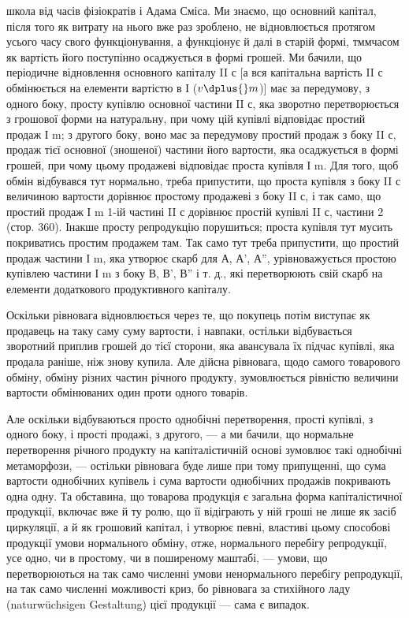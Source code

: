 \parcont{}  %
школа від часів фізіократів і Адама Сміса. Ми знаємо, що основний
капітал, після того як витрату на нього вже раз зроблено, не відновлюється
протягом усього часу свого функціонування, а функціонує й
далі в старій формі, тммчасом як вартість його поступінно осаджується
в формі грошей. Ми бачили, що періодичне відновлення основного капіталу
II с [а вся капітальна вартість II с обмінюється на елементи вартістю
в І ($v \dplus{} m$)] має за передумову, з одного боку, просту купівлю
основної частини II с, яка зворотно перетворюється з грошової форми
на натуральну, при чому цій купівлі відповідає простий продаж І m;
з другого боку, воно має за передумову простий продаж з боку
II с, продаж тієї основної (зношеної) частини його вартости, яка осаджується
в формі грошей, при чому цьому продажеві відповідає проста
купівля І m. Для того, щоб обмін відбувався тут нормально, треба припустити,
що проста купівля з боку II с величиною вартости дорівнює
простому продажеві з боку II с, і так само, що простий продаж І m
1-ій частині II с дорівнює простій купівлі II с, частини 2 (стор. 360).
Інакше просту репродукцію порушиться; проста купівля тут мусить
покриватись простим продажем там. Так само тут треба припустити,
що простий продаж частини І m, яка утворює скарб для А,
А', А'', урівноважується простою купівлею частини І m з боку В, В', В''
і т. д., які перетворюють свій скарб на елементи додаткового продуктивного
капіталу.

Оскільки рівновага відновлюється через те, що покупець потім виступає
як продавець на таку саму суму вартости, і навпаки, остільки відбувається
зворотний приплив грошей до тієї сторони, яка авансувала їх
підчас купівлі, яка продала раніше, ніж знову купила. Але дійсна рівновага,
щодо самого товарового обміну, обміну різних частин річного продукту,
зумовлюється рівністю величини вартости обмінюваних один проти
одного товарів.

Але оскільки відбуваються просто однобічні перетворення, прості
купівлі, з одного боку, і прості продажі, з другого, — а ми бачили, що
нормальне перетворення річного продукту на капіталістичній основі зумовлює
такі однобічні метаморфози, — остільки рівновага буде лише при
тому припущенні, що сума вартости однобічних купівель і сума вартости
однобічних продажів покривають одна одну. Та обставина, що товарова
продукція є загальна форма капіталістичної продукції, включає вже й ту
ролю, що її відіграють у ній гроші не лише як засіб циркуляції, а й
як грошовий капітал, і утворює певні, властиві цьому способові продукції
умови нормального обміну, отже, нормального перебігу репродукції,
усе одно, чи в простому, чи в поширеному маштабі, — умови,
що перетворюються на так само численні умови ненормального перебігу
репродукції, на так само численні можливості криз, бо рівновага за стихійного
ладу (naturwüchsigen Gestaltung) цієї продукції — сама є випадок.

